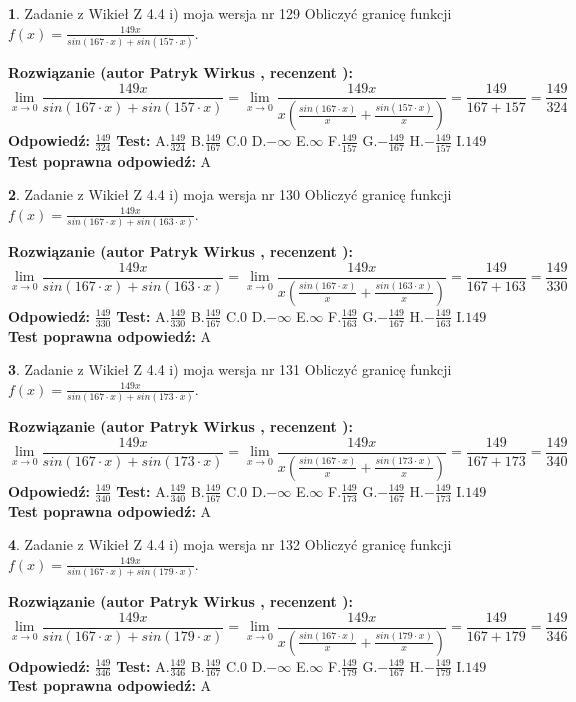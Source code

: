 \documentclass[12pt, a4paper]{article}
\theoremstyle{definition} %
\newtheorem{zad}{}
\newcommand{\zadStart}[1]{\begin{zad}#1\newline}
\newcommand{\zadStop}{\end{zad}}
\newcommand{\rozwStart}[2]{\noindent \textbf{Rozwiązanie (autor #1 , recenzent #2): }\newline}
\newcommand{\rozwStop}{\newline}
\newcommand{\odpStart}{\noindent \textbf{Odpowiedź:}\newline}
\newcommand{\odpStop}{\newline}
\newcommand{\testStart}{\noindent \textbf{Test:}\newline}
\newcommand{\testStop}{\newline}
\newcommand{\kluczStart}{\noindent \textbf{Test poprawna odpowiedź:}\newline}
\newcommand{\kluczStop}{\newline}
\begin{document}
\zadStart{Zadanie z Wikieł Z 4.4 i) moja wersja nr 129}
Obliczyć granicę funkcji $f(x)=\frac{149x}{sin(167\cdot x) +sin(157\cdot x)}$.
\zadStop
\rozwStart{Patryk Wirkus}{}
$$\lim\limits_{x\to 0}\frac{149x}{sin(167\cdot x) +sin(157\cdot x)}=\lim\limits_{x\to 0}\frac{149x}{x(\frac{sin(167\cdot x)}{x}+\frac{sin(157\cdot x)}{x})}=\frac{149}{167+157} = \frac{149}{324}$$
\rozwStop
\odpStart
$\frac{149}{324}$
\odpStop
\testStart
A.$\frac{149}{324}$
B.$\frac{149}{167}$
C.$0$
D.$-\infty$
E.$\infty$
F.$\frac{149}{157}$
G.$-\frac{149}{167}$
H.$-\frac{149}{157}$
I.$149$
\testStop
\kluczStart
A
\kluczStop



\zadStart{Zadanie z Wikieł Z 4.4 i) moja wersja nr 130}
Obliczyć granicę funkcji $f(x)=\frac{149x}{sin(167\cdot x) +sin(163\cdot x)}$.
\zadStop
\rozwStart{Patryk Wirkus}{}
$$\lim\limits_{x\to 0}\frac{149x}{sin(167\cdot x) +sin(163\cdot x)}=\lim\limits_{x\to 0}\frac{149x}{x(\frac{sin(167\cdot x)}{x}+\frac{sin(163\cdot x)}{x})}=\frac{149}{167+163} = \frac{149}{330}$$
\rozwStop
\odpStart
$\frac{149}{330}$
\odpStop
\testStart
A.$\frac{149}{330}$
B.$\frac{149}{167}$
C.$0$
D.$-\infty$
E.$\infty$
F.$\frac{149}{163}$
G.$-\frac{149}{167}$
H.$-\frac{149}{163}$
I.$149$
\testStop
\kluczStart
A
\kluczStop



\zadStart{Zadanie z Wikieł Z 4.4 i) moja wersja nr 131}
Obliczyć granicę funkcji $f(x)=\frac{149x}{sin(167\cdot x) +sin(173\cdot x)}$.
\zadStop
\rozwStart{Patryk Wirkus}{}
$$\lim\limits_{x\to 0}\frac{149x}{sin(167\cdot x) +sin(173\cdot x)}=\lim\limits_{x\to 0}\frac{149x}{x(\frac{sin(167\cdot x)}{x}+\frac{sin(173\cdot x)}{x})}=\frac{149}{167+173} = \frac{149}{340}$$
\rozwStop
\odpStart
$\frac{149}{340}$
\odpStop
\testStart
A.$\frac{149}{340}$
B.$\frac{149}{167}$
C.$0$
D.$-\infty$
E.$\infty$
F.$\frac{149}{173}$
G.$-\frac{149}{167}$
H.$-\frac{149}{173}$
I.$149$
\testStop
\kluczStart
A
\kluczStop



\zadStart{Zadanie z Wikieł Z 4.4 i) moja wersja nr 132}
Obliczyć granicę funkcji $f(x)=\frac{149x}{sin(167\cdot x) +sin(179\cdot x)}$.
\zadStop
\rozwStart{Patryk Wirkus}{}
$$\lim\limits_{x\to 0}\frac{149x}{sin(167\cdot x) +sin(179\cdot x)}=\lim\limits_{x\to 0}\frac{149x}{x(\frac{sin(167\cdot x)}{x}+\frac{sin(179\cdot x)}{x})}=\frac{149}{167+179} = \frac{149}{346}$$
\rozwStop
\odpStart
$\frac{149}{346}$
\odpStop
\testStart
A.$\frac{149}{346}$
B.$\frac{149}{167}$
C.$0$
D.$-\infty$
E.$\infty$
F.$\frac{149}{179}$
G.$-\frac{149}{167}$
H.$-\frac{149}{179}$
I.$149$
\testStop
\kluczStart
A
\kluczStop
\end{document}
